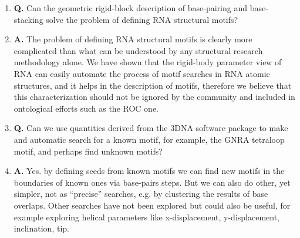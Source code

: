 \begin{enumerate}
\item{\textbf{Q.}  Can   the  geometric  rigid-block   description  of
  base-pairing  and base-stacking  solve the  problem of  defining RNA
  structural motifs?}
\item{\textbf{A.}  The problem  of defining  RNA structural  motifs is
  clearly  more  complicated  than  what  can  be  understood  by  any
  structural  research  methodology  alone.  We have  shown  that  the
  rigid-body parameter view of RNA  can easily automate the process of
  motif  searches  in RNA  atomic  structures,  and  it helps  in  the
  description   of   motifs,    therefore   we   believe   that   this
  characterization should not be ignored by the community and included
  in ontological efforts such as the ROC one.}
\item{\textbf{Q.} Can we use quantities derived from the 3DNA software
  package to make and automatic search for a known motif, for example,
  the GNRA tetraloop motif, and perhaps find unknown motifs?}
\item{\textbf{A.} Yes. by defining seeds from known motifs we can find
new motifs in  the boundaries of known ones  via base-pairs steps. But
we  can also  do  other,  yet simpler,  not  as ``precise''  searches,
e.g. by clustering  the results of base overlaps.  Other searches have
not  been explored  but could  also be  useful, for  example exploring
helical  parameters like x-displacement,  y-displacement, inclination,
tip.} 
\end{enumerate}



